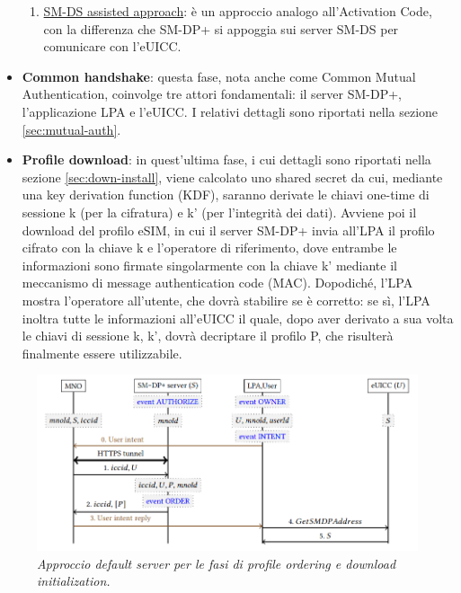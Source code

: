 \documentclass[10pt, oneside]{book}
\begin{document}
\begin{itemize}
\begin{enumerate}
\item \underline{SM-DS assisted approach}: è un approccio analogo all'Activation Code, con la differenza che SM-DP+ si appoggia sui server SM-DS per comunicare con l'eUICC.
\end{enumerate}
\item \textbf{Common handshake}: questa fase, nota anche come Common Mutual Authentication, coinvolge tre attori fondamentali: il server SM-DP+, l'applicazione LPA e l'eUICC. I relativi dettagli sono riportati nella sezione \ref{sec:mutual-auth}.
\item \textbf{Profile download}: in quest'ultima fase, i cui dettagli sono riportati nella sezione \ref{sec:down-install}, viene calcolato uno shared secret da cui, mediante una key derivation function (KDF), saranno derivate le chiavi one-time di sessione k (per la cifratura) e k' (per l'integrità dei dati). Avviene poi il download del profilo eSIM, in cui il server SM-DP+ invia all'LPA il profilo cifrato con la chiave k e l'operatore di riferimento, dove entrambe le informazioni sono firmate singolarmente con la chiave k' mediante il meccanismo di message authentication code (MAC). Dopodiché, l'LPA mostra l'operatore all'utente, che dovrà stabilire se è corretto: se sì, l'LPA inoltra tutte le informazioni all'eUICC il quale, dopo aver derivato a sua volta le chiavi di sessione k, k', dovrà decriptare il profilo P, che risulterà finalmente essere utilizzabile.
\end{itemize}
\begin{figure}
\includegraphics[width=\linewidth]{default-server.png}
\caption{\textit{Approccio default server per le fasi di profile ordering e download initialization.}}
\label{fig:default-server}
\end{figure}
\end{document}
